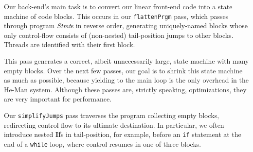 \documentclass[preprint]{sigplanconf}
\renewcommand{\t}{\texttt}
\renewcommand{\b}{\textbf}
\renewcommand{\i}{\textit}
\begin{document}
Our back-end's main task is to convert our linear front-end code into a state
machine of code blocks. This occurs in our \t{flattenPrgm} pass, which passes
through program \i{Stmt}s in reverse order, generating uniquely-named blocks
whose only control-flow consists of (non-nested) tail-position jumps to other
blocks. Threads are identified with their first block.




This pass generates a correct, albeit unnecessarily large, state machine with
many empty blocks. Over the next few passes, our goal is to shrink this state
machine as much as possible, because yielding to the main loop is the only
overhead in the He-Man system. Although these passes are, strictly speaking,
optimizations, they are very important for performance.

Our \t{simplifyJumps} pass traverses the program collecting empty blocks,
redirecting control flow to its ultimate destination. In particular, we often
introduce nested \b{If}s in tail-position, for example, before an \t{if}
statement at the end of a \t{while} loop, where control resumes in one of three
blocks.
\end{document}
